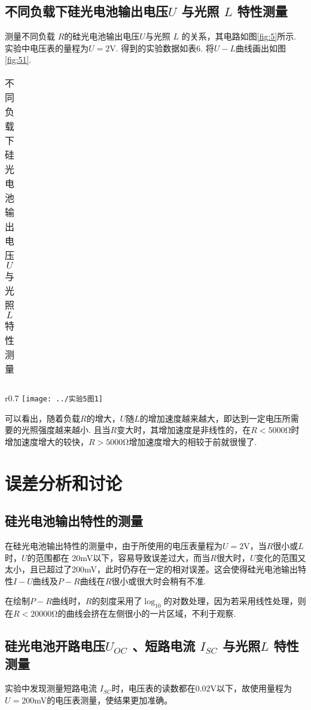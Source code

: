 \documentclass[11pt]{article}
\begin{document}
\subsection{不同负载下硅光电池输出电压$ U $ 与光照 $ L $ 特性测量}
测量不同负载 $ R $的硅光电池输出电压$ U  $与光照 $ L $ 的关系，其电路如图\ref{fig:5}所示. 实验中电压表的量程为$ U=2 $V. 得到的实验数据如表6. 将$ U-L $曲线画出如图\ref{fig:51}.

\begin{table}[htbp]\small
	\centering
	\caption{不同负载下硅光电池输出电压$ U $ 与光照 $ L $ 特性测量}
	\begin{tabular}{ccccccccc}
	\end{tabular}
\end{table}
\begin{wrapfigure}{r}{0.7\linewidth}
	\centering
	\texttt{[image: ../实验5图1]}
	\caption{不同负载下硅光电池的$ U-L $曲线}
	\label{fig:51}
\end{wrapfigure}

可以看出，随着负载$ R $的增大，$ U $随$L$的增加速度越来越大，即达到一定电压所需要的光照强度越来越小. 且当$ R $变大时，其增加速度是非线性的，在$ R<5000 $Ω时增加速度增大的较快，$ R>5000 $Ω增加速度增大的相较于前就很慢了.
\section{误差分析和讨论}
\subsection{硅光电池输出特性的测量}
在硅光电池输出特性的测量中，由于所使用的电压表量程为$ U=2 $V，当$ R $很小或$ L $时，$ U $的范围都在
20mV以下，容易导致误差过大，而当$ R $很大时，$ U $变化的范围又太小，且已超过了200mV，此时仍存在一定的相对误差。这会使得硅光电池输出特性$ I-U $曲线及$ P-R $曲线在$ R $很小或很大时会稍有不准.

在绘制$ P-R $曲线时，$ R $的刻度采用了$ \log_{10} $的对数处理，因为若采用线性处理，则在$ R<20000 $Ω的曲线会挤在左侧很小的一片区域，不利于观察.
\subsection{硅光电池开路电压$ U_{OC} $ 、短路电流 $ I_{SC}  $ 与光照$  L $ 特性测量}
实验中发现测量短路电流 $ I_{SC}  $时，电压表的读数都在0.02V以下，故使用量程为$ U=200 $mV的电压表测量，使结果更加准确。
\end{document}

